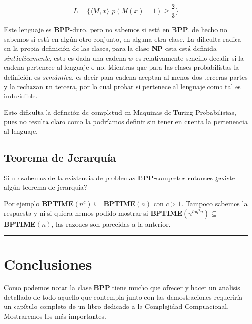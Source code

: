 \documentclass[12pt,letterpaper]{article}
\newcommand{\lineaxd}{{\color{brown}\rule{\linewidth}{0.5mm}}}
\begin{document}
$$L = \{\langle M, x \rangle : p(M(x)=1) \geq \frac{2}{3}\}$$

Este lenguaje es \textbf{BPP}-duro, pero no sabemos si está en \textbf{BPP}, de hecho no sabemos si está en algún otro conjunto, en alguna otra clase. La dificulta radica en la propia definición de las clases, para la clase \textbf{NP} esta está definida \textit{sintácticamente}, esto es dada una cadena $w$ es relativamente sencillo decidir si la cadena pertenece al lenguaje o no. Mientras que para las clases probabilistas la definición es \textit{semántica}, es decir para cadena aceptan al menos dos terceras partes y la rechazan un tercera, por lo cual probar si pertenece al lenguaje como tal es indecidible.

Esto dificulta la definción de completud en Maquinas de Turing Probabilistas, pues no resulta claro como la podríamos definir sin tener en cuenta la pertenencia al lenguaje.

\subsection*{Teorema de Jerarquía}
Si no sabemos de la existencia de problemas \textbf{BPP}-completos entonces ¿existe algún teorema de jerarquía?

Por ejemplo \textbf{BPTIME$(n^c) \subseteq $ BPTIME$(n)$} con $c > 1$. Tampoco sabemos la respuesta y ni si quiera hemos podido mostrar si \textbf{BPTIME$(n^{log^2 n}) \subseteq $ BPTIME$(n)$}, las razones son parecidas a la anterior.

\lineaxd
\section*{Conclusiones}
Como podemos notar la clase \textbf{BPP} tiene mucho que ofrecer y hacer un analisis detallado de todo aquello que contempla junto con las demostraciones requeriría un capítulo completo de un libro dedicado a la Complejidad Compuacional. Mostraremos los más importantes.
\end{document}
